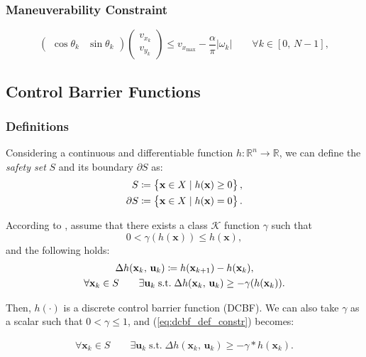 \documentclass[main.tex]{subfiles}
\begin{document}
\subsubsection{Maneuverability Constraint}
\[
\begin{pmatrix}
\cos \theta_k & \sin \theta_k
\end{pmatrix}
\begin{pmatrix}
v_{x_k} \\
v_{y_k}
\end{pmatrix}
\leq v_{x_{\max}} - \frac{\alpha}{\pi} |\omega_k|
\qquad \forall k \in \left[0,\, N-1 \right],
\]

\subsection{Control Barrier Functions}

\subsubsection{Definitions}
Considering a continuous and differentiable function $h: \mathbb{R}^n \rightarrow \mathbb{R}$, we can define the \textit{safety set} $S$ and its boundary $\partial S$ as:
\begin{align*}
S \coloneqq \left\{ \mathbf{x} \in X \mid  h(\mathbf{x}) \geq 0\right\}, \notag \\
\partial S \coloneqq \left\{ \mathbf{x} \in X \mid  h(\mathbf{x}) = 0\right\}. \notag  \\
\end{align*}

According to \cite{zeng2021safetycriticalmodelpredictivecontrol}, %
assume that there exists a class $\mathcal{K}$ function $\gamma$ such that
$$
0 < \gamma(h(\mathbf{x})) \leq h(\mathbf{x}),
$$
and the following holds:
\begin{gather}
\Delta h(\mathbf{x}_k,\, \mathbf{u}_k) \coloneqq h(\mathbf{x}_{k+1}) - h(\mathbf{x}_{k}), \notag \\
\forall \mathbf{x}_k \in S \qquad \exists \mathbf{u}_k \; \text{s.t.} \; \Delta h(\mathbf{x}_k,\, \mathbf{u}_k) \geq -\gamma(h(\mathbf{x}_k)). \label{eq:dcbf_def_constr}
\end{gather}

Then, $h(\cdot)$ is a discrete control barrier function (DCBF). We can also take $\gamma$ as a scalar such that $0 < \gamma \leq 1$, and (\ref{eq:dcbf_def_constr}) becomes:

\begin{gather*}
    \forall \mathbf{x}_k \in S \qquad \exists \mathbf{u}_k \; \text{s.t.} \; \Delta h(\mathbf{x}_k,\, \mathbf{u}_k) \geq -\gamma * h(\mathbf{x}_k). 
\end{gather*}
\end{document}

